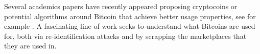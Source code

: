 Several academics papers have recently appeared proposing cryptocoins or potential algorithms around Bitcoin that achieve better usage properties, see for example \cite{bonneau2014mixcoin}.
A fascinating line of work \cite{meiklejohn2013fistful,soska2015measuring} seeks to understand what Bitcoins are used for, both via re-identification attacks and by scrapping the marketplaces that they are used in.

